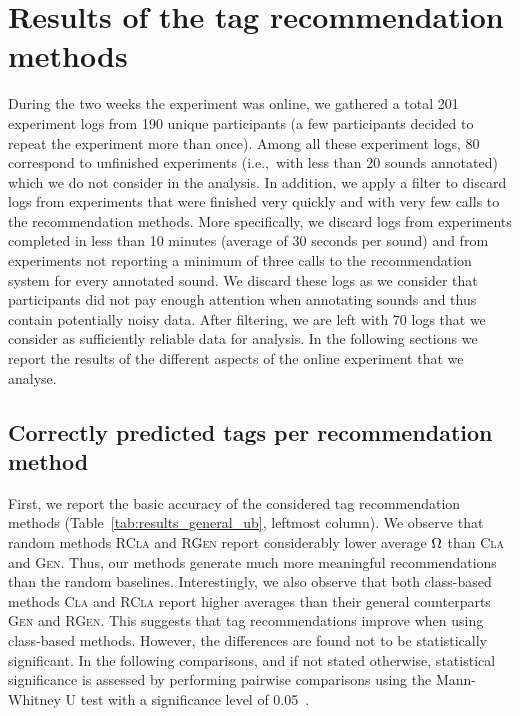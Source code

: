 \section{Results of the tag recommendation methods}
\label{class:sec:results}

During the two weeks the experiment was online, we gathered a total 201 experiment logs from 190 unique participants (a few participants decided to repeat the experiment more than once). Among all these experiment logs, 80 correspond to unfinished experiments (i.e.,~with less than 20 sounds annotated) which we do not consider in the analysis. In addition, we apply a filter to discard logs from experiments that were finished very quickly and with very few calls to the recommendation methods. More specifically, we discard logs from experiments completed in less than 10 minutes (average of 30 seconds per sound) and from experiments not reporting a minimum of three calls to the recommendation system for every annotated sound. We discard these logs as we consider that participants did not pay enough attention when annotating sounds and thus contain potentially noisy data. After filtering, we are left with 70 logs that we consider as sufficiently reliable data for analysis. In the following sections we report the results of the different aspects of the online experiment that we analyse.

\subsection{Correctly predicted tags per recommendation method}
\label{class:sec:accepted_tags_results}

First, we report the basic accuracy of the considered tag recommendation methods (Table~\ref{tab:results_general_ub}, leftmost column).
We observe that random methods \textsc{RCla} and \textsc{RGen} report considerably lower average $\Omega$ than \textsc{Cla} and \textsc{Gen}. Thus, our methods generate much more meaningful recommendations than the random baselines. Interestingly, we also observe that both class-based methods \textsc{Cla} and \textsc{RCla} report higher averages than their general counterparts \textsc{Gen} and \textsc{RGen}. This suggests that tag recommendations improve when using class-based methods. However, the differences are found not to be statistically significant. In the following comparisons, and if not stated otherwise, statistical significance is assessed by performing pairwise comparisons using the Mann-Whitney U test with a significance level of 0.05~\citep{Corder2009}. 

